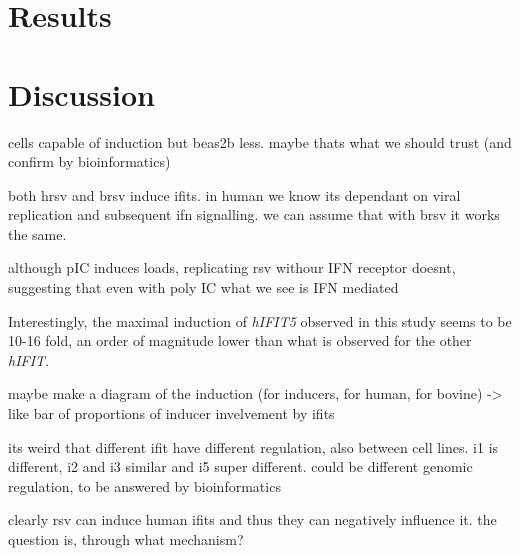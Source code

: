 \section{Results} \label{sec:Results-Chapter 1}


\section{Discussion} \label{sec:Discussion Chapter 1}


cells capable of induction but beas2b less. maybe thats what we should trust (and confirm by bioinformatics)

both hrsv and brsv induce ifits. in human we know its dependant on viral replication and subsequent ifn signalling. we can assume that with brsv it works the same.

although pIC induces loads, replicating rsv withour IFN receptor doesnt, suggesting that even with poly IC what we see is IFN mediated

Interestingly, the maximal induction of \textit{hIFIT5} observed in this study seems to be 10-16 fold, an order of magnitude lower than what is observed for the other \textit{hIFIT}.


maybe make a diagram of the induction (for inducers, for human, for bovine) -> like bar of proportions of inducer invelvement by ifits

its weird that different ifit have different regulation, also between cell lines. i1 is different, i2 and i3 similar and i5 super different. could be different genomic regulation, to be answered by bioinformatics

clearly rsv can induce human ifits and thus they can negatively influence it. the question is, through what mechanism? 



